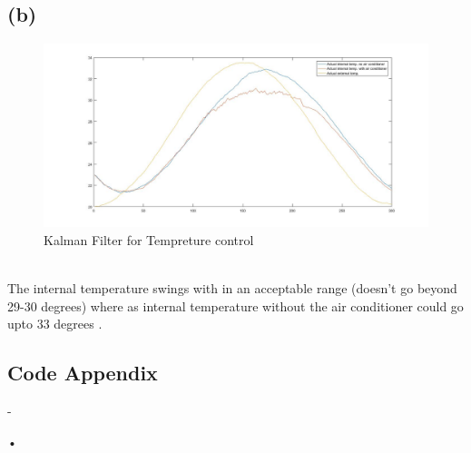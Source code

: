\documentclass[a4paper,11pt]{article}
\begin{document}
\subsection*{(b)}
\begin{figure}[h]
  \hspace*{-5cm}
   \includegraphics[scale=0.45]{q3_b}
   \caption{Kalman Filter for Tempreture control}\label{fig:q3}
\end{figure}
\quad \\
The internal temperature swings with in an acceptable range (doesn't go beyond 29-30 degrees) where as internal temperature without the air conditioner could go upto 33 degrees .

\clearpage
\newpage
\begin{appendix}
\section*{Code Appendix}
 -
 
 
 

\end{appendix}•
\end{document}
